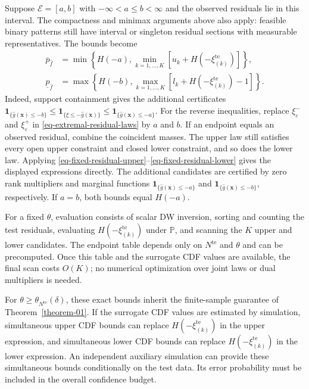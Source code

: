 \begin{remark}
  \label{rem-interval-support}
  Suppose $\mathcal E=[a,b]$ with $-\infty<a\le b<\infty$ and the observed residuals lie in this interval. The compactness and minimax arguments above also apply: feasible binary patterns still have interval or singleton residual sections with measurable representatives. The bounds become
  \begin{align}
    \overline p_{\hat f}
    &=\min\left\{H(-a),\min_{k=1,\ldots,K}\left[u_k+H\left(-\xi_{(k)}^{\mathrm{te}}\right)\right]\right\},
    \label{eq-dw-interval-upper}\\
    \underline p_{\hat f}
    &=\max\left\{H(-b),\max_{k=1,\ldots,K}\left[l_k+H\left(-\xi_{(k)}^{\mathrm{te}}\right)-1\right]\right\}.
    \label{eq-dw-interval-lower}
  \end{align}
  Indeed, support containment gives the additional certificates
  $\mathbf1_{\{\hat g(\bm x)\le-b\}}\le\mathbf1_{\{\xi\le-\hat g(\bm x)\}}\le\mathbf1_{\{\hat g(\bm x)\le-a\}}$.
  For the reverse inequalities, replace $\xi^-_\varepsilon$ and $\xi^+_\varepsilon$ in \eqref{eq-extremal-residual-laws} by $a$ and $b$. If an endpoint equals an observed residual, combine the coincident masses. The upper law still satisfies every open upper constraint and closed lower constraint, and so does the lower law. Applying \eqref{eq-fixed-residual-upper}--\eqref{eq-fixed-residual-lower} gives the displayed expressions directly. The additional candidates are certified by zero rank multipliers and marginal functions $\mathbf1_{\{\hat g(\bm x)\le-a\}}$ and $\mathbf1_{\{\hat g(\bm x)\le-b\}}$, respectively. If $a=b$, both bounds equal $H(-a)$.
\end{remark}

For a fixed $\theta$, evaluation consists of scalar DW inversion, sorting and counting the test residuals, evaluating $H\left(-\xi_{(k)}^{\mathrm{te}}\right)$ under $\mathbb P$, and scanning the $K$ upper and lower candidates. The endpoint table depends only on $N^{\mathrm{te}}$ and $\theta$ and can be precomputed. Once this table and the surrogate CDF values are available, the final scan costs $O(K)$; no numerical optimization over joint laws or dual multipliers is needed.

For $\theta\ge\theta_{N^{\mathrm{te}}}(\delta)$, these exact bounds inherit the finite-sample guarantee of Theorem~\ref{theorem-01}. If the surrogate CDF values are estimated by simulation, simultaneous upper CDF bounds can replace $H\left(-\xi_{(k)}^{\mathrm{te}}\right)$ in the upper expression, and simultaneous lower CDF bounds can replace $H\left(-\xi_{(k)}^{\mathrm{te}}\right)$ in the lower expression. An independent auxiliary simulation can provide these simultaneous bounds conditionally on the test data. Its error probability must be included in the overall confidence budget.

